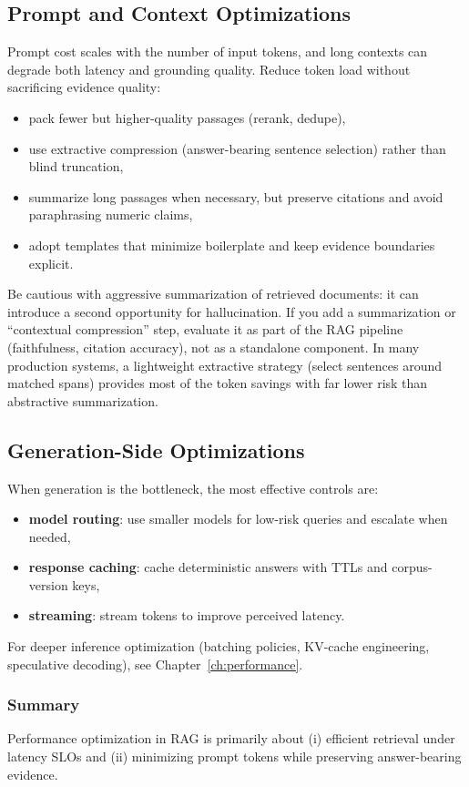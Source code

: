 \subsection{Prompt and Context Optimizations}
Prompt cost scales with the number of input tokens, and long contexts can degrade both latency and grounding quality. Reduce token load without sacrificing evidence quality:
\begin{itemize}
    \item pack fewer but higher-quality passages (rerank, dedupe),
    \item use extractive compression (answer-bearing sentence selection) rather than blind truncation,
    \item summarize long passages when necessary, but preserve citations and avoid paraphrasing numeric claims,
    \item adopt templates that minimize boilerplate and keep evidence boundaries explicit.
\end{itemize}

Be cautious with aggressive summarization of retrieved documents: it can introduce a second opportunity for hallucination. If you add a summarization or ``contextual compression'' step, evaluate it as part of the RAG pipeline (faithfulness, citation accuracy), not as a standalone component. In many production systems, a lightweight extractive strategy (select sentences around matched spans) provides most of the token savings with far lower risk than abstractive summarization.

\subsection{Generation-Side Optimizations}
When generation is the bottleneck, the most effective controls are:
\begin{itemize}
    \item \textbf{model routing}: use smaller models for low-risk queries and escalate when needed,
    \item \textbf{response caching}: cache deterministic answers with TTLs and corpus-version keys,
    \item \textbf{streaming}: stream tokens to improve perceived latency.
\end{itemize}
For deeper inference optimization (batching policies, KV-cache engineering, speculative decoding), see Chapter~\ref{ch:performance}.

\subsubsection*{Summary}
Performance optimization in RAG is primarily about (i) efficient retrieval under latency SLOs and (ii) minimizing prompt tokens while preserving answer-bearing evidence.

